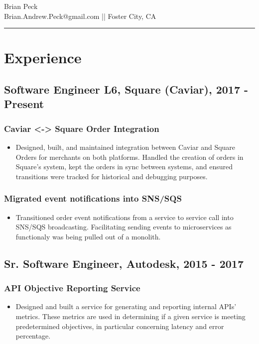 \documentclass[11pt]{article}
\title{}
\date{}
\begin{document}
\begin{center}
{\huge Brian Peck} \\
Brian.Andrew.Peck@gmail.com || Foster City, CA
\hrule
\end{center}

\section*{Experience}
\label{sec-1}
\subsection*{Software Engineer L6, Square (Caviar), 2017 - Present}
\label{sec-1-1}
\subsubsection*{Caviar <-> Square Order Integration}
\label{sec-1-2-1}

\begin{itemize}
\item Designed, built, and maintained integration between Caviar and Square Orders for merchants on both platforms. Handled the creation of orders in Square's system, kept the orders in sync between systems, and ensured transitions were tracked for historical and debugging purposes.
\end{itemize}

\subsubsection*{Migrated event notifications into SNS/SQS}
\label{sec-1-2-1}
\begin{itemize}
\item Transitioned order event notifications from a service to service call into SNS/SQS broadcasting. Facilitating sending events to microservices as functionaly was being pulled out of a monolith.
\end{itemize}

\subsection*{Sr. Software Engineer, Autodesk, 2015 - 2017}
\label{sec-1-2}
\subsubsection*{API Objective Reporting Service}
\label{sec-1-2-1}

\begin{itemize}
\item Designed and built a service for generating and reporting internal APIs' metrics. These metrics are used in determining if a given service is meeting predetermined objectives, in particular concerning latency and error percentage.
\end{itemize}
\end{document}

